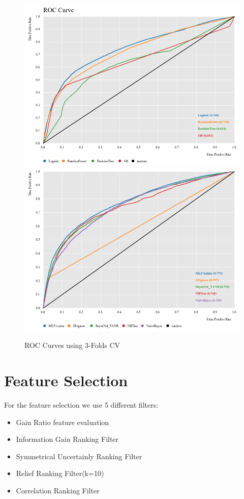 \documentclass[fleqn,10pt]{SelfArx} %
\begin{document}
\begin{figure}[h]
	\includegraphics[width=\linewidth]{ROC_III.png}
	\includegraphics[width=\linewidth]{ROC_IandII.png}
	\caption{ROC Curves using 3-Folds CV}
	\label{fig:ROC_3fcv}
\end{figure}


\section{Feature Selection}
For the feature selection we use 5 different filters:
\begin{itemize}[noitemsep]
	\item Gain Ratio feature evaluation
	\item Information Gain Ranking Filter
	\item Symmetrical Uncertainly Ranking Filter
	\item Relief Ranking Filter(k=10)
	\item Correlation Ranking Filter
\end{itemize}
\end{document}

